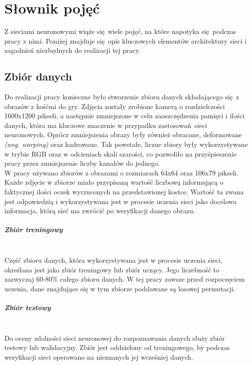
\chapter{Słownik pojęć}
Z sieciami neuronowymi wiąże się wiele pojęć, na które napotyka się podczas pracy z nimi.
Poniżej znajduje się opis kluczowych elementów architektury sieci i zagadnień niezbędnych
do realizacji tej pracy.

\section{Zbiór danych}
Do realizacji pracy konieczne było stworzenie zbioru danych składającego się z obrazów
z kośćmi do gry. Zdjęcia zostały zrobione kamerą o rozdzielczości 1600x1200 pikseli,
a następnie zmniejszone w celu zaoszczędzenia pamięci i ilości danych,
która ma kluczowe znaczenie w przypadku zastosowań sieci neuronowych.
Oprócz zmniejszenia obrazy były również obracane, deformowane \textit{(ang. warping)} oraz kadrowane.
Tak powstałe, liczne zbiory były wykorzystywane w trybie RGB oraz w odcieniach skali szarości,
co pozwoliło na przyśpieszenie pracy przez zmniejszenie liczby kanałów do jednego.\\
W pracy używano zbiorów z obrazami o rozmiarach 64x64 oraz 106x79 pikseli. Każde zdjęcie
w zbiorze miało przypisaną wartość liczbową informującą o faktycznej ilości oczek wyrzuconych
na przedstawionej kostce. Wartość ta zwana jest odpowiedzią i wykorzystywana jest w
procesie uczenia sieci jako docelowa informacja, którą sieć ma zwrócić po weryfikacji danego obrazu.

\paragraph{Zbiór treningowy} \mbox{}\\
Część zbioru danych, która wykorzystywana jest w procesie uczenia sieci, określana jest jako zbiór
treningowy lub zbiór uczący. Jego liczebność to zazwyczaj 60-80\% całego zbioru danych.
W tej pracy zawsze przed rozpoczęciem uczenia, dane znajdujące się w tym zbiorze poddawane są losowej permutacji.

\paragraph{Zbiór testowy} \mbox{}\\
Do oceny zdolności sieci neuronowej do rozpoznawania danych służy zbiór testowy lub
walidacyjny. Zbiór jest oddzielony od treningowego, by podczas weryfikacji sieci operowano
na nieznanych jej wcześniej danych.

